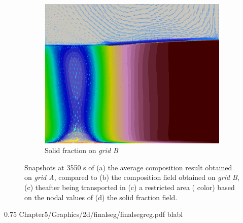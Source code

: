 \begin{figure}[htbp]
\begin{subfigure}[t]{0.4\textwidth}
  \includegraphics[width=\textwidth]{Chapter5/Graphics/2d/1700s_gs_vl.png}
  \caption{Solid fraction on \emph{grid B}}
    \label{fig:1700s_gs}
  \end{subfigure}
\caption{Snapshots at 3550 s of (a) the average composition result obtained on \emph{grid A}, compared to (b) the composition field obtained on \emph{grid B}, 
(c) theafter being transported in (c) a restricted area ( color) based on the nodal values of (d) the solid fraction field.}
\label{fig:W_mask_1700s}
\end{figure}



\begin{figureth}
{0.75}
{Chapter5/Graphics/2d/finalseg/finalsegreg.pdf}
{blabl}
\label{fig:smacs_final}
\end{figureth}



























\cleardoublepage
